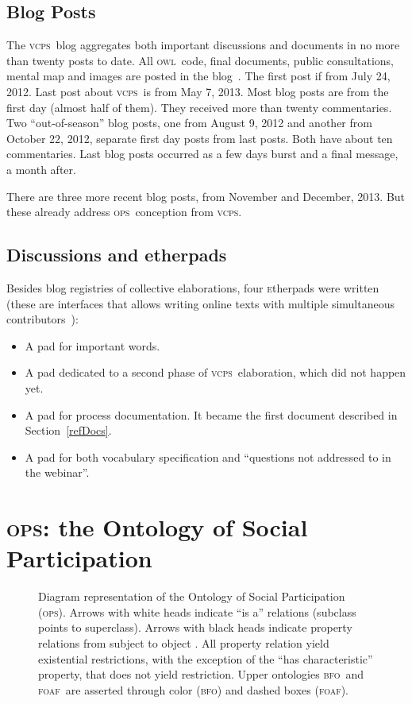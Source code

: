 \documentclass[10pt,letterpaper]{article}
\newcommand{\ops}{\textsc{ops}}
\newcommand{\vcps}{\textsc{vcps}}
\newcommand{\owl}{\textsc{owl}}
\newcommand{\bfo}{\textsc{bfo}}
\newcommand{\foaf}{\textsc{foaf}}
\newcommand{\etherpad}{\textsc{e}therpad}
\begin{document}
\subsection{Blog Posts}
The \vcps\ blog
aggregates both important discussions and documents in no more than twenty posts to date.
All \owl\ code, final documents, public consultations, mental map and images are posted in the blog~\cite{coraisBlog}. 
The first post if from July 24, 2012. Last post about \vcps\ is from May 7, 2013. Most blog posts are from the first day (almost half of them). They received more than
twenty commentaries. Two ``out-of-season'' blog posts, one from August 9, 2012 and another from October  22, 2012, separate first day posts from last posts. Both have about ten commentaries.
Last blog posts occurred as a few days burst and a final message, a month after.

There are three more recent blog posts, from November and December, 2013. But these already address \ops\ conception from \vcps.

\subsection{Discussions and etherpads}
Besides blog registries of collective elaborations, four \etherpad s
were written~\cite{etherpads} (these are interfaces that allows writing online texts with multiple simultaneous contributors~\cite{etherpads2}):
\begin{itemize}
    \item A pad for important words.
    \item A pad dedicated to a second phase of \vcps\ elaboration, which did not happen yet.
    \item A pad for process documentation. It became the first document described in Section~\ref{refDocs}. 
    \item A pad for both vocabulary specification and ``questions not addressed to in the webinar''.
\end{itemize}



\section{\ops: the Ontology of Social Participation}\label{exp}

\begin{figure}
    \centering
    \caption{Diagram representation of the Ontology of Social Participation (\ops). Arrows with white heads indicate ``is a'' relations (subclass points to superclass). Arrows with black heads indicate property relations from subject to object . All property relation yield existential restrictions, with the exception of the ``has characteristic'' property, that does not yield restriction. Upper ontologies \bfo\ and \foaf\ are asserted through color (\bfo) and dashed boxes (\foaf).}
    \label{fig:v1}
\end{figure}
\end{document}
